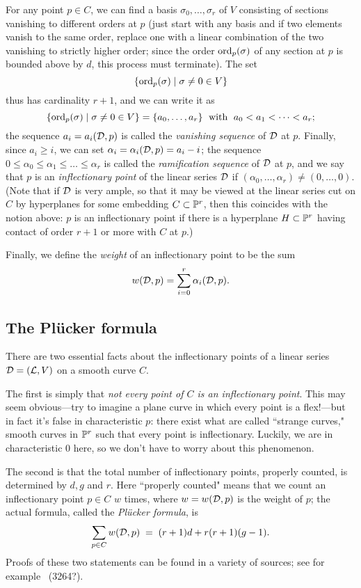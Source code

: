 For any point $p \in C$, we can find a basis $\sigma_0, \dots, \sigma_r$ of $V$ consisting of sections vanishing to different orders at $p$ (just start with any basis and if two elements vanish to the same order, replace one with a linear combination of the two vanishing to strictly higher order; since the order $\operatorname{ord}_p(\sigma)$ of any section at $p$ is bounded above by $d$, this process must terminate). The set
$$
\{ \operatorname{ord}_p(\sigma) \mid \sigma \neq 0 \in V \}
$$
thus has cardinality $r+1$, and we can write it as
$$
\{ \operatorname{ord}_p(\sigma) \mid \sigma \neq 0 \in V \} = \{a_0,\dots,a_r\} \; \text{ with } \; a_0 < a_1 < \dots < a_r;
$$
the sequence $a_i = a_i({\mathcal D},p)$ is called the \emph{vanishing sequence} of ${\mathcal D}$ at $p$.  Finally, since $a_i \geq i$, we can set $\alpha_i = \alpha_i({\mathcal D},p) = a_i - i$; the sequence $0 \leq \alpha_0 \leq \alpha_1 \leq \dots \leq \alpha_r$ is called the \emph{ramification sequence} of ${\mathcal D}$ at $p$, and we say that $p$ is an \emph{inflectionary point} of the linear series ${\mathcal D}$ if $(\alpha_0,\dots,\alpha_r) \neq (0,\dots,0)$. (Note that if ${\mathcal D}$ is very ample, so that it may be viewed at the linear series cut on $C$ by hyperplanes for some embedding $C \subset {\mathbb P}^r$, then this coincides with the notion above: $p$ is an inflectionary point if there is a hyperplane $H \subset {\mathbb P}^r$ having contact of order $r+1$ or more with $C$ at $p$.)

Finally, we define the \emph{weight} of an inflectionary point to be the sum
$$
w({\mathcal D}, p) = \sum_{i=0}^r \alpha_i({\mathcal D}, p).
$$

\subsection{The Pl\"ucker formula}

There are two essential facts about the inflectionary points of a linear series ${\mathcal D} = ({\mathcal L},V)$ on a smooth curve $C$.

The first is simply that \emph{not every point of $C$ is an inflectionary point}. This may seem obvious---try to imagine a plane curve in which every point is a flex!---but in fact it's false in characteristic $p$: there exist what are called ``strange curves," smooth curves in ${\mathbb P}^r$ such that every point is inflectionary. Luckily, we are in characteristic 0 here, so we don't have to worry about this phenomenon.

The second is that the total number of inflectionary points, properly counted, is determined by $d, g$ and $r$. Here ``properly counted" means that we count an inflectionary point $p \in C$ $w$ times, where $w = w({\mathcal D},p)$ is the weight of $p$; the actual formula, called the \emph{Pl\"ucker formula}, is
\begin{equation}\label{Plucker formula}
\sum_{p \in C} w({\mathcal D}, p) \; = \; (r+1)d + r(r+1)(g-1).
\end{equation}
Proofs of these two statements can be found in a variety of sources; see for example~\cite{} (3264?). 

